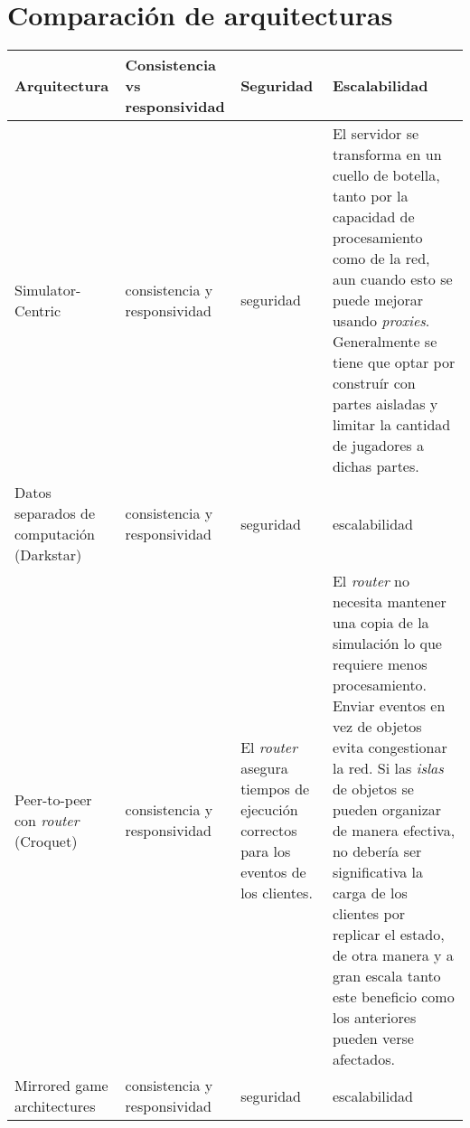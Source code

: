 \section{Comparación de arquitecturas}

%

\small
\begin{longtable}{|p{2cm}|p{4cm}|p{4cm}|p{4cm}|}
\hline
\textbf{Arquitectura} & \textbf{Consistencia vs responsividad} & \textbf{Seguridad} & \textbf{Escalabilidad} \\ \hline
Simulator-Centric &
consistencia y responsividad &
seguridad &
El servidor se transforma en un cuello de botella, tanto por la capacidad de procesamiento como de la red, aun cuando esto se puede mejorar usando \emph{proxies}. Generalmente se tiene que optar por construír con partes aisladas y limitar la cantidad de jugadores a dichas partes. \\
\hline
Datos separados de computación (Darkstar) &
consistencia y responsividad &
seguridad &
escalabilidad \\
\hline
Peer-to-peer con \emph{router} (Croquet) &
consistencia y responsividad &
El \emph{router} asegura tiempos de ejecución correctos para los eventos de los clientes. &
El \emph{router} no necesita mantener una copia de la simulación lo que requiere menos procesamiento. \newline
Enviar eventos en vez de objetos evita congestionar la red. \newline
Si las \emph{islas} de objetos se pueden organizar de manera efectiva, no debería ser significativa la carga de los clientes por replicar el estado, de otra manera y a gran escala tanto este beneficio como los anteriores pueden verse afectados. \\
\hline
Mirrored game architectures &
consistencia y responsividad &
seguridad &
escalabilidad \\
\hline
\end{longtable}
\normalsize


